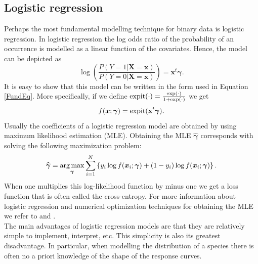 \subsection{Logistic regression}
Perhaps the most fundamental modelling technique for binary data is logistic regression. In logistic regression the log odds ratio of the probability of an occurrence is modelled as a linear function of the covariates. Hence, the model can be depicted as \[\log \left( \frac{P(Y=1|\bm{X} = \bm{x})}{P(Y=0|\bm{X} = \bm{x})} \right)= \bm{x}^t \bm{\gamma}.\]
It is easy to show that this model can be written in the form used in Equation \ref{FundEq}. More specifically, if we define $\text{expit}(\cdot) = \frac{\exp(\cdot)}{1+\exp(\cdot)}$ we get \[f(\bm{x};\bm{\gamma}) = \text{expit}(\mathbf{x}^t\bm{\gamma}).\] Usually the coefficients of a logistic regression model are obtained by using maximum likelihood estimation (MLE). Obtaining the MLE $\widehat{\bm{\gamma}}$ corresponds with solving the following maximization problem:
\[\widehat{\bm{\gamma}} = \operatorname*{arg\,max}_{\bm{\gamma}} \sum_{i=1}^{N} \left\lbrace y_i \log{f(\bm{x}_i;\bm{\gamma})}  + (1-y_i)\log{f(\bm{x}_i;\bm{\gamma})}  \right\rbrace.\] 
When one multiplies this log-likelihood function by minus one we get a loss function that is often called the cross-entropy. For more information about logistic regression and numerical optimization techniques for obtaining the MLE we refer to \cite{agresti_categorical_2013} and \cite{mccullagh_generalized_1999}. \\

The main advantages of logistic regression models are that they are relatively simple to implement, interpret, etc. This simplicity is also its greatest disadvantage. In particular, when modelling the distribution of a species there is often no a priori knowledge of the shape of the response curves.

